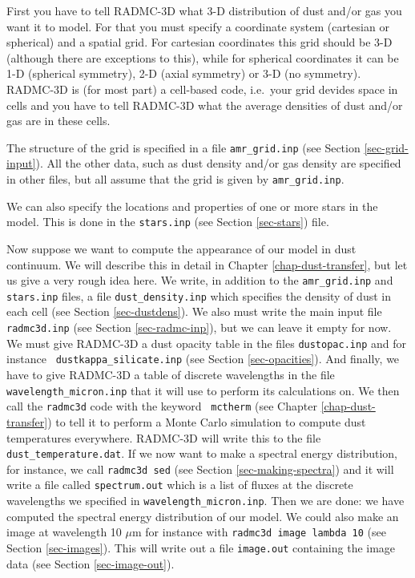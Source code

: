 \documentclass{report}
\begin{document}
First you have to tell RADMC-3D what 3-D distribution of dust and/or gas you
want it to model. For that you must specify a coordinate system (cartesian
or spherical) and a spatial grid. For cartesian coordinates this grid should
be 3-D (although there are exceptions to this), while for spherical
coordinates it can be 1-D (spherical symmetry), 2-D (axial symmetry) or 3-D
(no symmetry). RADMC-3D is (for most part) a cell-based code, i.e.\ your
grid devides space in cells and you have to tell RADMC-3D what the average
densities of dust and/or gas are in these cells.

The structure of the grid is specified in a file {\small\tt amr\_grid.inp}
(see Section \ref{sec-grid-input}). All the other data, such as dust density
and/or gas density are specified in other files, but all assume that the
grid is given by {\small\tt amr\_grid.inp}.

We can also specify the locations and properties of one or more stars in the
model. This is done in the {\small\tt stars.inp} (see Section
\ref{sec-stars}) file.

Now suppose we want to compute the appearance of our model in dust
continuum. We will describe this in detail in Chapter
\ref{chap-dust-transfer}, but let us give a very rough idea here. We write,
in addition to the {\small\tt amr\_grid.inp} and {\small\tt stars.inp}
files, a file {\small\tt dust\_density.inp} which specifies the density of
dust in each cell (see Section \ref{sec-dustdens}).  We also must write the
main input file {\small\tt radmc3d.inp} (see Section \ref{sec-radmc-inp}), but
we can leave it empty for now. We must give RADMC-3D a dust opacity table in
the files {\small\tt dustopac.inp} and for instance {\small\tt
  dustkappa\_silicate.inp} (see Section \ref{sec-opacities}). And finally, we
have to give RADMC-3D a table of discrete wavelengths in the file {\small\tt
  wavelength\_micron.inp} that it will use to perform its calculations
on. We then call the {\small\tt radmc3d} code with the keyword {\small\tt
  mctherm} (see Chapter \ref{chap-dust-transfer}) to tell it to perform a
Monte Carlo simulation to compute dust temperatures everywhere. RADMC-3D
will write this to the file {\small\tt dust\_temperature.dat}. If we now
want to make a spectral energy distribution, for instance, we call
{\small\tt radmc3d sed} (see Section \ref{sec-making-spectra}) and it will
write a file called {\small\tt spectrum.out} which is a list of fluxes at
the discrete wavelengths we specified in {\small\tt wavelength\_micron.inp}.
Then we are done: we have computed the spectral energy distribution of our
model. We could also make an image at wavelength 10 $\mu$m for instance with
{\small\tt radmc3d image lambda 10} (see Section \ref{sec-images}). This
will write out a file {\small\tt image.out} containing the image data
(see Section \ref{sec-image-out}).
\end{document}

